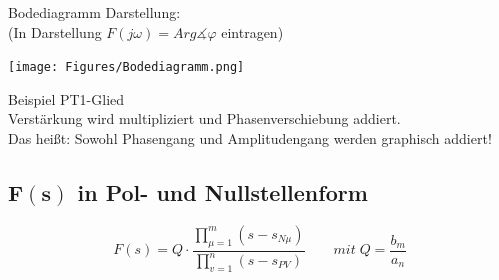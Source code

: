 Bodediagramm Darstellung:\\ 
(In Darstellung $F(j \omega) = Arg \measuredangle \varphi$ eintragen)
\begin{center}
	\texttt{[image: Figures/Bodediagramm.png]}
\end{center}
\begin{mdframed}[style=exercise]



	Beispiel PT1-Glied\\
	Verstärkung wird multipliziert und Phasenverschiebung addiert.\\ Das
	heißt: Sowohl Phasengang und Amplitudengang werden graphisch addiert!
\end{mdframed}

\subsection{$\mathbf{F(s)}$ in Pol- und Nullstellenform}

\[
	F(s)=Q \cdot \frac{\prod_{\mu=1}^{m}\left(s-s_{N \mu}\right)}{\prod_{v=1}^{n}\left(s-s_{P V}\right)}
	\qquad {mit \;} Q = \frac{b_m}{a_n}
\]

